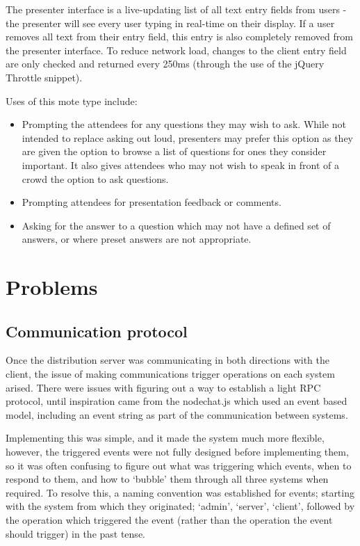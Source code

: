 \documentclass[a4papert,11pt,notitlepage]{ltxdoc}
\begin{document}
The presenter interface is a live-updating list of all text entry fields from users - the presenter will see every user typing in real-time on their display. If a user removes all text from their entry field, this entry is also completely removed from the presenter interface. To reduce network load, changes to the client entry field are only checked and returned every 250ms (through the use of the jQuery Throttle\cite{jquerythrottle:web} snippet).

Uses of this mote type include:
\begin{itemize}
\item Prompting the attendees for any questions they may wish to ask. While not intended to replace asking out loud, presenters may prefer this option as they are given the option to browse a list of questions for ones they consider important. It also gives attendees who may not wish to speak in front of a crowd the option to ask questions.
\item Prompting attendees for presentation feedback or comments.
\item Asking for the answer to a question which may not have a defined set of answers, or where preset answers are not appropriate.
\end{itemize}

\pagebreak
\section{Problems}
\subsection{Communication protocol}
Once the distribution server was communicating in both directions with the client, the issue of making communications trigger operations on each system arised. There were issues with figuring out a way to establish a light RPC protocol, until inspiration came from the nodechat.js\cite{nodechatjs:web} which used an event based model, including an event string as part of the communication between systems. 

Implementing this was simple, and it made the system much more flexible, however, the triggered events were not fully designed before implementing them, so it was often confusing to figure out what was triggering which events, when to respond to them, and how to `bubble' them through all three systems when required. To resolve this, a naming convention was established for events; starting with the system from which they originated; `admin', `server', `client', followed by the operation which triggered the event (rather than the operation the event should trigger) in the past tense. 
\end{document}
